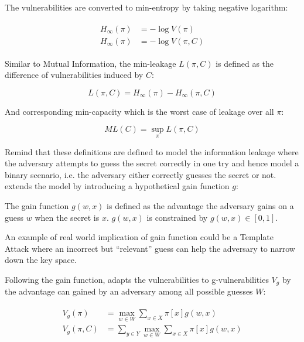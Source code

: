 \begin{definition}
	The vulnerabilities are converted to min-entropy by taking negative logarithm:
	
	\begin{eqnarray}
		\begin{aligned}
			H_{\infty}(\pi) &= -\log{V(\pi)} \\
			H_{\infty}(\pi) &= -\log{V(\pi,C)}
		\end{aligned}
	\end{eqnarray}
	
	Similar to Mutual Information, the min-leakage $L(\pi,C)$ is defined as the difference of vulnerabilities induced by $C$:
	
	\begin{equation}
		L(\pi, C) = H_{\infty}(\pi) - H_{\infty}(\pi, C)
	\end{equation}
	
	And corresponding min-capacity which is the worst case of leakage over all $\pi$:
	
	\begin{equation}
		ML(C) = \sup_{\pi}{L(\pi,C)}
	\end{equation}
\end{definition}

Remind that these definitions are defined to model the information leakage where the adversary attempts to guess the secret correctly in one try and hence model a binary scenario, i.e. the adversary either correctly guesses the secret or not. \cite{GLeakage} extends the model by introducing a hypothetical gain function $g$:

\begin{definition}
	The gain function $g(w,x)$ is defined as the advantage the adversary gains on a guess $w$ when the secret is $x$. $g(w,x)$ is constrained by $g(w,x) \in [0,1]$.
\end{definition}

An example of real world implication of gain function could be a Template Attack\cite{TemplateAttack} \cite{PracticalTemplate} where an incorrect but ``relevant'' guess can help the adversary to narrow down the key space.

Following the gain function, \cite{GLeakage} adapts the vulnerabilities to g-vulnerabilities $V_g$ by the advantage can gained by an adversary among all possible guesses $W$:

\begin{eqnarray}
	\begin{aligned}
		V_{g}(\pi) &= \max_{w \in W}\sum_{x \in X}{\pi[x]g(w,x)} \\
		V_{g}(\pi, C) &= \sum_{y \in Y}{\max_{w \in W}\sum_{x \in X}{\pi[x]g(w,x)}}
	\end{aligned}
\end{eqnarray}

